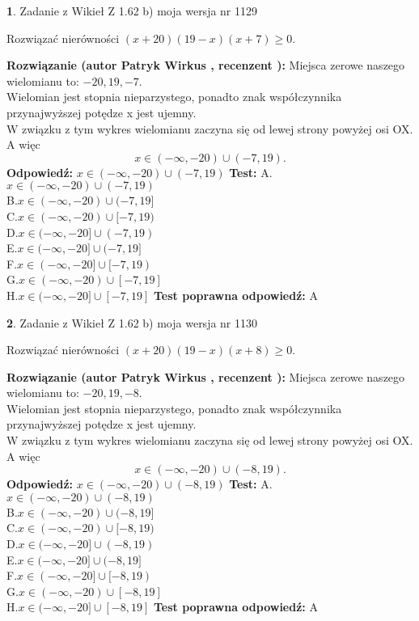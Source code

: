 \documentclass[12pt, a4paper]{article}
\theoremstyle{definition} %
\newtheorem{zad}{}
\newcommand{\zadStart}[1]{\begin{zad}#1\newline}
\newcommand{\zadStop}{\end{zad}}
\newcommand{\rozwStart}[2]{\noindent \textbf{Rozwiązanie (autor #1 , recenzent #2): }\newline}
\newcommand{\rozwStop}{\newline}
\newcommand{\odpStart}{\noindent \textbf{Odpowiedź:}\newline}
\newcommand{\odpStop}{\newline}
\newcommand{\testStart}{\noindent \textbf{Test:}\newline}
\newcommand{\testStop}{\newline}
\newcommand{\kluczStart}{\noindent \textbf{Test poprawna odpowiedź:}\newline}
\newcommand{\kluczStop}{\newline}
\begin{document}
\zadStart{Zadanie z Wikieł Z 1.62 b) moja wersja nr 1129}

Rozwiązać nierówności $(x+20)(19-x)(x+7)\ge0$.
\zadStop
\rozwStart{Patryk Wirkus}{}
Miejsca zerowe naszego wielomianu to: $-20, 19, -7$.\\
Wielomian jest stopnia nieparzystego, ponadto znak współczynnika przy\linebreak najwyższej potędze x jest ujemny.\\ W związku z tym wykres wielomianu zaczyna się od lewej strony powyżej osi OX. A więc $$x \in (-\infty,-20) \cup (-7,19).$$
\rozwStop
\odpStart
$x \in (-\infty,-20) \cup (-7,19)$
\odpStop
\testStart
A.$x \in (-\infty,-20) \cup (-7,19)$\\
B.$x \in (-\infty,-20) \cup (-7,19]$\\
C.$x \in (-\infty,-20) \cup [-7,19)$\\
D.$x \in (-\infty,-20] \cup (-7,19)$\\
E.$x \in (-\infty,-20] \cup (-7,19]$\\
F.$x \in (-\infty,-20] \cup [-7,19)$\\
G.$x \in (-\infty,-20) \cup [-7,19]$\\
H.$x \in (-\infty,-20] \cup [-7,19]$
\testStop
\kluczStart
A
\kluczStop



\zadStart{Zadanie z Wikieł Z 1.62 b) moja wersja nr 1130}

Rozwiązać nierówności $(x+20)(19-x)(x+8)\ge0$.
\zadStop
\rozwStart{Patryk Wirkus}{}
Miejsca zerowe naszego wielomianu to: $-20, 19, -8$.\\
Wielomian jest stopnia nieparzystego, ponadto znak współczynnika przy\linebreak najwyższej potędze x jest ujemny.\\ W związku z tym wykres wielomianu zaczyna się od lewej strony powyżej osi OX. A więc $$x \in (-\infty,-20) \cup (-8,19).$$
\rozwStop
\odpStart
$x \in (-\infty,-20) \cup (-8,19)$
\odpStop
\testStart
A.$x \in (-\infty,-20) \cup (-8,19)$\\
B.$x \in (-\infty,-20) \cup (-8,19]$\\
C.$x \in (-\infty,-20) \cup [-8,19)$\\
D.$x \in (-\infty,-20] \cup (-8,19)$\\
E.$x \in (-\infty,-20] \cup (-8,19]$\\
F.$x \in (-\infty,-20] \cup [-8,19)$\\
G.$x \in (-\infty,-20) \cup [-8,19]$\\
H.$x \in (-\infty,-20] \cup [-8,19]$
\testStop
\kluczStart
A
\kluczStop
\end{document}
